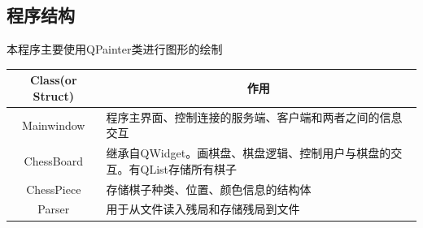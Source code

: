 \documentclass[a4paper,10pt]{article}
\begin{document}
        \subsection{程序结构}
                本程序主要使用QPainter类进行图形的绘制\par
                \begin{table}[htbp]
                \centering
                \begin{tabular*}{.9\textwidth}{cp{}}
                \toprule[1.2pt]
                Class(or Struct)&\multicolumn{1}{c}{作用}\\
                \midrule
                Mainwindow&程序主界面、控制连接的服务端、客户端和两者之间的信息交互\\
                ChessBoard&继承自QWidget。画棋盘、棋盘逻辑、控制用户与棋盘的交互。有QList存储所有棋子\\
                ChessPiece&存储棋子种类、位置、颜色信息的结构体\\
                Parser&用于从文件读入残局和存储残局到文件\\
                \bottomrule[1.2pt]
                \end{tabular*}
                \end{table}
\end{document}
